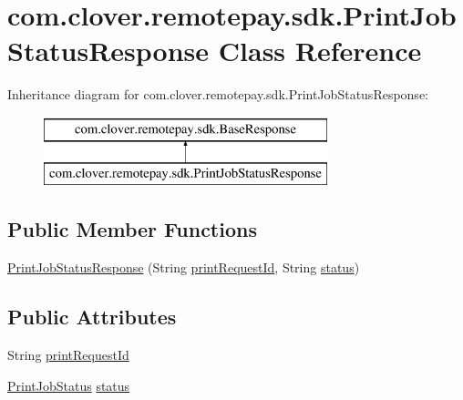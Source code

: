 \hypertarget{classcom_1_1clover_1_1remotepay_1_1sdk_1_1_print_job_status_response}{}\section{com.\+clover.\+remotepay.\+sdk.\+Print\+Job\+Status\+Response Class Reference}
\label{classcom_1_1clover_1_1remotepay_1_1sdk_1_1_print_job_status_response}
Inheritance diagram for com.\+clover.\+remotepay.\+sdk.\+Print\+Job\+Status\+Response\+:\begin{figure}[H]
\begin{center}
\leavevmode
\includegraphics[height=2.000000cm]{classcom_1_1clover_1_1remotepay_1_1sdk_1_1_print_job_status_response}
\end{center}
\end{figure}
\subsection*{Public Member Functions}
\begin{DoxyCompactItemize}
\item 
\hyperlink{classcom_1_1clover_1_1remotepay_1_1sdk_1_1_print_job_status_response_ac47c28481f35fd003f525a66e838a2bc}{Print\+Job\+Status\+Response} (String \hyperlink{classcom_1_1clover_1_1remotepay_1_1sdk_1_1_print_job_status_response_a4d8fdc4d90a8bc93379382b1f6e51859}{print\+Request\+Id}, String \hyperlink{classcom_1_1clover_1_1remotepay_1_1sdk_1_1_print_job_status_response_adfd80c8ec89a8344133ed3fdab40f0e8}{status})
\end{DoxyCompactItemize}
\subsection*{Public Attributes}
\begin{DoxyCompactItemize}
\item 
String \hyperlink{classcom_1_1clover_1_1remotepay_1_1sdk_1_1_print_job_status_response_a4d8fdc4d90a8bc93379382b1f6e51859}{print\+Request\+Id}
\item 
\hyperlink{namespacecom_1_1clover_1_1remotepay_1_1sdk_a7f035b9087c646b0eebf6280d429f7af}{Print\+Job\+Status} \hyperlink{classcom_1_1clover_1_1remotepay_1_1sdk_1_1_print_job_status_response_adfd80c8ec89a8344133ed3fdab40f0e8}{status}
\end{DoxyCompactItemize}
